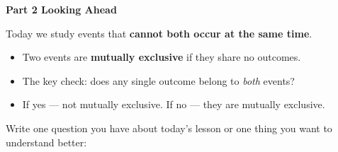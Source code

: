 \documentclass[10pt]{article}
\begin{document}
\vspace{0.3in}

{\large\bfseries\color{navy} Part 2 \quad Looking Ahead}

\vspace{0.12in}

\noindent Today we study events that \textbf{cannot both occur at the same time}.

\vspace{0.14in}

\begin{tcolorbox}[colback=greenbg, colframe=greenacc, boxrule=0.8pt, arc=2mm,
    left=4mm, right=4mm, top=3mm, bottom=3mm]
    \small
    \begin{itemize}[leftmargin=1.3em, itemsep=8pt]
      \item Two events are \textbf{mutually exclusive} if they share no outcomes.
      \item The key check: does any single outcome belong to \emph{both} events?
      \item If yes --- not mutually exclusive. If no --- they are mutually exclusive.
    \end{itemize}
\end{tcolorbox}

\vspace{0.2in}

\noindent\textcolor{slate}{\small Write one question you have about today's lesson or
one thing you want to understand better:}\\[8pt]
\writeline\\[2pt]\writeline
\end{document}
